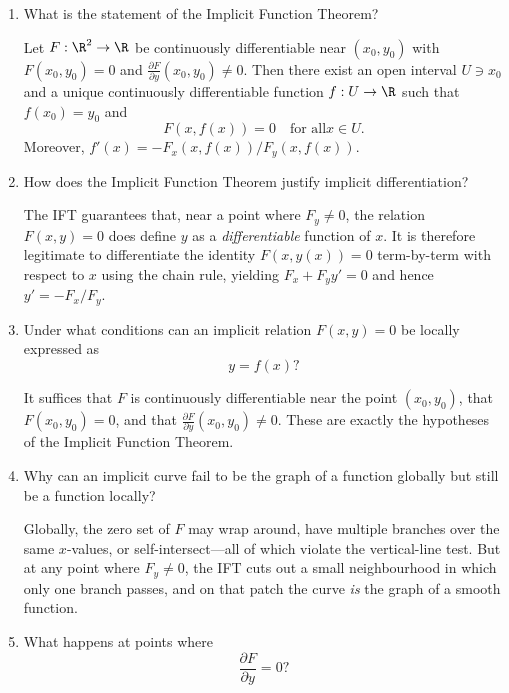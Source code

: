 \documentclass{self-check}
\begin{document}
\begin{enumerate}[leftmargin=*, itemsep=8pt]
    \begin{answer}
      Writing \(y'=f(x,y)\), the right-hand side assigns to each point \((x,y)\) the number \(f(x,y)\), which specifies the slope---equivalently, the direction \((1, f(x,y))\) up to scaling---of any solution curve passing through that point. This is exactly a \emph{vector field} (or direction field) on the plane.
    \end{answer}
  \item What is the statement of the Implicit Function Theorem?

    \begin{answer}
      Let \(F:\R^{2}\to\R\) be continuously differentiable near \((x_{0},y_{0})\) with \(F(x_{0},y_{0})=0\) and \(\frac{\partial F}{\partial y}(x_{0},y_{0})\neq 0\). Then there exist an open interval \(U\ni x_{0}\) and a unique continuously differentiable function \(f : U \to \R\) such that \(f(x_{0})=y_{0}\) and
      \[ F(x,f(x))=0 \quad \text{for all}x\in U. \]
      Moreover, \(f'(x)=-F_{x}(x,f(x))/F_{y}(x,f(x))\).
    \end{answer}
  \item How does the Implicit Function Theorem justify implicit differentiation?

    \begin{answer}
      The IFT guarantees that, near a point where \(F_{y}\neq 0\), the relation \(F(x,y)=0\) does define \(y\) as a \emph{differentiable} function of \(x\). It is therefore legitimate to differentiate the identity \(F(x,y(x))=0\) term-by-term with respect to \(x\) using the chain rule, yielding \(F_{x} + F_{y} y'=0\) and hence \(y'=-F_{x}/F_{y}\).
    \end{answer}
  \item Under what conditions can an implicit relation \(F(x,y)=0\) be locally expressed as
    \[ y=f(x)? \]

    \begin{answer}
      It suffices that \(F\) is continuously differentiable near the point \((x_{0},y_{0})\), that \(F(x_{0},y_{0})=0\), and that \(\frac{\partial F}{\partial y}(x_{0},y_{0})\neq 0\). These are exactly the hypotheses of the Implicit Function Theorem.
    \end{answer}
  \item Why can an implicit curve fail to be the graph of a function globally but still be a function locally?

    \begin{answer}
      Globally, the zero set of \(F\) may wrap around, have multiple branches over the same \(x\)-values, or self-intersect---all of which violate the vertical-line test. But at any point where \(F_{y}\neq 0\), the IFT cuts out a small neighbourhood in which only one branch passes, and on that patch the curve \emph{is} the graph of a smooth function.
    \end{answer}
  \item What happens at points where
    \[ \frac{\partial F}{\partial y}=0? \]


\end{enumerate}
\end{document}
